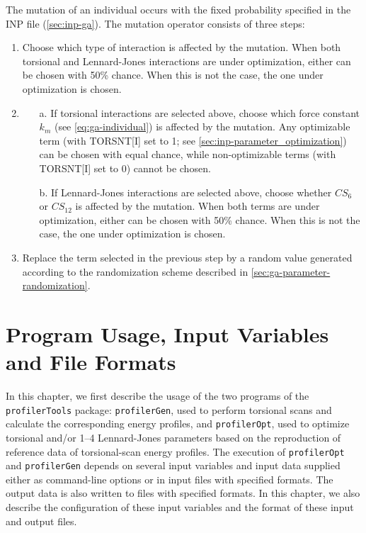 \documentclass[10pt,a4paper,openany]{memoir}
\numberwithin{equation}{section}
\newcommand{\profileropt}[0]{\texttt{profilerOpt}}
\newcommand{\profilergen}[0]{\texttt{profilerGen}}
\newcommand{\profilertools}[0]{\texttt{profilerTools}}
\begin{document}
The mutation of an individual occurs with the fixed probability specified in the
INP file (\autoref{sec:inp-ga}). The mutation operator
consists of three steps:
\begin{enumerate}
\item Choose which type of interaction is affected by the mutation.  When both
  torsional and Lennard-Jones interactions are under optimization, either can be
  chosen with 50\% chance.  When this is not the case, the one under
  optimization is chosen.
\item
  \begin{enumerate}
  \item [a.] If torsional interactions are selected above, choose
    which force constant $k_m$ (see \autoref{eq:ga-individual}) is
    affected by the mutation. Any optimizable term (with TORSNT[I] set
    to 1; see \autoref{sec:inp-parameter_optimization}) can be chosen with equal
    chance, while non-optimizable terms (with TORSNT[I] set to 0)
    cannot be chosen.
  \item [b.] If Lennard-Jones interactions are selected above, choose whether $CS_6$ or
    $CS_{12}$ is affected by the mutation. When both terms are under
    optimization, either can be chosen with 50\% chance. When this is not the
    case, the one under optimization is chosen.
  \end{enumerate}
\item Replace the term selected in the previous step by a random value generated
  according to the randomization scheme described in
  \autoref{sec:ga-parameter-randomization}.
\end{enumerate}


\chapter{Program Usage, Input Variables and File Formats}
\label{chap:file-formats}


In this chapter, we first describe the usage of the two programs of
the \profilertools{} package: \profilergen{}, used to perform
torsional scans and calculate the corresponding energy profiles, and
\profileropt{}, used to optimize torsional and/or 1--4 Lennard-Jones
parameters based on the reproduction of reference data of
torsional-scan energy profiles.  The execution of \profileropt{} and
\profilergen{} depends on several input variables and input data
supplied either as command-line options or in input files with
specified formats. The output data is also written to files with
specified formats. In this chapter, we also describe the configuration
of these input variables and the format of these input and output
files.
\end{document}
